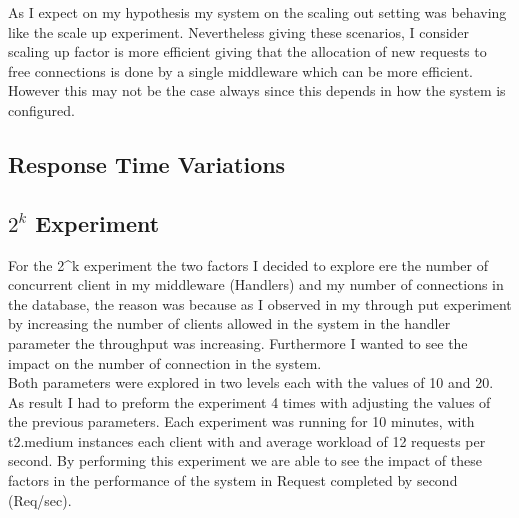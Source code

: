 \begin{table}\centering
         \caption{}
         \label{scaleout}
 \end{table} 
As I expect on my hypothesis my system on the scaling out setting was behaving like the scale up experiment. Nevertheless giving these scenarios, I consider scaling up factor is more efficient giving that the allocation of new requests to free connections is done by a single middleware which can be more efficient. However this may not be the case always since this depends in how the system is configured.\\

\subsection{Response Time Variations}\label{sec:response-time-variations}



\subsection{$2^k$ Experiment}\label{sec:k-experiment}
For the 2\^{}k experiment the two factors I decided to explore ere the number of concurrent client in my middleware (Handlers) and my number of connections in the database, the reason was because as I observed in my through put experiment by increasing the number of clients allowed in the system in the handler parameter the throughput was increasing. Furthermore I wanted to see the impact on the number of connection in the system.\\

Both parameters were explored in two levels each with the values of 10 and 20. As result I had to preform the experiment 4 times with adjusting the values of the previous parameters. Each experiment was running for 10 minutes, with t2.medium instances each client with and average workload of 12 requests per second.
By performing this experiment we are able to see the impact of these factors in the performance of the system in Request completed by second (Req/sec).

